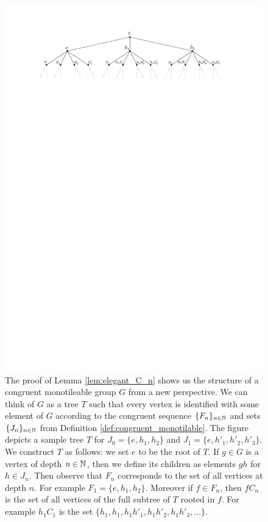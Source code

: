 \begin{figure}
\centering
\includegraphics[scale=1]{../Graphics/tree_representation2}
\caption{The proof of Lemma \ref{lem:elegant_C_n} shows us the structure of a congruent monotileable group $G$ from a new perspective. We can think of $G$ as a tree $T$ such that every vertex is identified with some element of $G$ according to the congruent \Folner sequence $\{F_n\}_{n\in\mathbb{N}}$ and  sets $\{J_n\}_{n\in\mathbb{N}}$ from Definition \ref{def:congruent_monotilable}. The figure depicts a sample tree $T$ for $J_0=\{e,h_1,h_2\}$ and  $J_1=\{e,h'_1,h'_2,h'_3\}$. We construct $T$ as follows: 
we set $e$ to be the root of $T$. If $g\in G$ is a vertex of depth $n\in\mathbb{N}$, then we define its children as elements $gh$ for $h\in J_n$. Then observe that $F_n$ corresponds to the set of all vertices at depth $n$. For example $F_1 = \{e,h_1,h_2\}$. Moreover if $f\in F_n$, then $fC_n$ is the set of all vertices of the full subtree of $T$ rooted in $f$. For example $h_1C_1$ is the set $\{h_1,h_1,h_1h'_1,h_1h'_2,h_1h'_3,\ldots \}$.}\label{fig:tree}
\end{figure}

